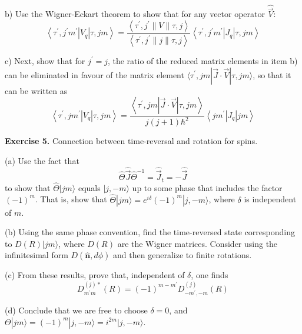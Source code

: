 \documentclass[12pt]{article}
\begin{document}
b) Use the Wigner-Eckart theorem to show that for any vector operator $\hat{\vec{V}}$:
\[
\left\langle\tau^{\prime}, j^{\prime} m^{\prime}\left|V_{q}\right| \tau, j m\right\rangle=\frac{\left\langle\tau^{\prime}, j^{\prime}\|V\| \tau, j\right\rangle}{\left\langle\tau^{\prime}, j^{\prime}\|j\| \tau, j\right\rangle}\left\langle\tau^{\prime}, j^{\prime} m^{\prime}\left|J_{q}\right| \tau, j m\right\rangle
\]

c) Next, show that for \(j^{\prime}=j\), the ratio of the reduced matrix elements in item b) can be
eliminated in favour of the matrix element \(\langle\tau^{\prime}, j m|\vec{J} \cdot \vec{V}| \tau, j m\rangle\), so that it can be written as
\[
\left\langle\tau^{\prime}, j m^{\prime}\left|V_{q}\right| \tau, j m\right\rangle=\frac{\left\langle\tau^{\prime}, j m|\vec{J} \cdot \vec{V}| \tau, j m\right\rangle}{j(j+1) \hbar^{2}}\left\langle j m^{\prime}\left|J_{q}\right| j m\right\rangle
\]


\textbf{Exercise 5.} Connection between time-reversal and rotation for spins.

(a) Use the fact that
\[
\hat{\Theta} \hat{\vec{J}} \hat{\Theta}^{-1}=\hat{\vec{J}}_{t}=-\hat{\vec{J}}
\]
 to show that $\hat\Theta|j m\rangle$ equals $|j,-m\rangle$ up to some phase that includes the factor
$(-1)^{m}$. That is, show that $\hat\Theta|j m\rangle=e^{i \delta}(-1)^{m}|j,-m\rangle$, where $\delta$ is independent of $m$.

(b) Using the same phase convention, find the time-reversed state corresponding to ${D}(R)|j m\rangle$,
where $D(R)$ are the Wigner matrices.
Consider using the infinitesimal form ${D}(\hat{\mathbf{n}}, d \phi)$ and then generalize to finite rotations.

(c) From these results, prove that, independent of $\delta$, one finds
\[
{D}_{m^{\prime} m}^{(j) *}(R)=(-1)^{m-m^{\prime}} {D}_{-m^{\prime},-m}^{(j)}(R)
\]

(d) Conclude that we are free to choose $\delta=0$, and $\Theta|j m\rangle=(-1)^{m}|j,-m\rangle=i^{2 m}|j,-m\rangle$.
\end{document}
